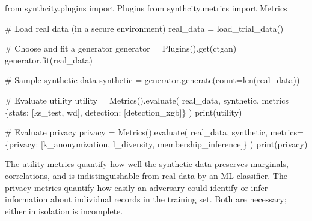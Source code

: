 \documentclass[
  letterpaper,
  11pt]{scrbook}
\newenvironment{Shaded}{\begin{snugshade}}{\end{snugshade}}
\newcommand{\BuiltInTok}[1]{\textcolor[rgb]{0.00,0.23,0.31}{#1}}
\newcommand{\CommentTok}[1]{\textcolor[rgb]{0.37,0.37,0.37}{#1}}
\newcommand{\ImportTok}[1]{\textcolor[rgb]{0.00,0.46,0.62}{#1}}
\newcommand{\NormalTok}[1]{\textcolor[rgb]{0.00,0.23,0.31}{#1}}
\newcommand{\OperatorTok}[1]{\textcolor[rgb]{0.37,0.37,0.37}{#1}}
\newcommand{\StringTok}[1]{\textcolor[rgb]{0.13,0.47,0.30}{#1}}
\begin{document}
\begin{Shaded}
\begin{Highlighting}[]
\ImportTok{from}\NormalTok{ synthcity.plugins }\ImportTok{import}\NormalTok{ Plugins}
\ImportTok{from}\NormalTok{ synthcity.metrics }\ImportTok{import}\NormalTok{ Metrics}

\CommentTok{\# Load real data (in a secure environment)}
\NormalTok{real\_data }\OperatorTok{=}\NormalTok{ load\_trial\_data()}

\CommentTok{\# Choose and fit a generator}
\NormalTok{generator }\OperatorTok{=}\NormalTok{ Plugins().get(}\StringTok{\textquotesingle{}ctgan\textquotesingle{}}\NormalTok{)}
\NormalTok{generator.fit(real\_data)}

\CommentTok{\# Sample synthetic data}
\NormalTok{synthetic }\OperatorTok{=}\NormalTok{ generator.generate(count}\OperatorTok{=}\BuiltInTok{len}\NormalTok{(real\_data))}

\CommentTok{\# Evaluate utility}
\NormalTok{utility }\OperatorTok{=}\NormalTok{ Metrics().evaluate(}
\NormalTok{    real\_data, synthetic,}
\NormalTok{    metrics}\OperatorTok{=}\NormalTok{\{}\StringTok{\textquotesingle{}stats\textquotesingle{}}\NormalTok{: [}\StringTok{\textquotesingle{}ks\_test\textquotesingle{}}\NormalTok{, }\StringTok{\textquotesingle{}wd\textquotesingle{}}\NormalTok{],}
             \StringTok{\textquotesingle{}detection\textquotesingle{}}\NormalTok{: [}\StringTok{\textquotesingle{}detection\_xgb\textquotesingle{}}\NormalTok{]\}}
\NormalTok{)}
\BuiltInTok{print}\NormalTok{(utility)}

\CommentTok{\# Evaluate privacy}
\NormalTok{privacy }\OperatorTok{=}\NormalTok{ Metrics().evaluate(}
\NormalTok{    real\_data, synthetic,}
\NormalTok{    metrics}\OperatorTok{=}\NormalTok{\{}\StringTok{\textquotesingle{}privacy\textquotesingle{}}\NormalTok{: [}\StringTok{\textquotesingle{}k\_anonymization\textquotesingle{}}\NormalTok{,}
                         \StringTok{\textquotesingle{}l\_diversity\textquotesingle{}}\NormalTok{,}
                         \StringTok{\textquotesingle{}membership\_inference\textquotesingle{}}\NormalTok{]\}}
\NormalTok{)}
\BuiltInTok{print}\NormalTok{(privacy)}
\end{Highlighting}
\end{Shaded}

The utility metrics quantify how well the synthetic data preserves
marginals, correlations, and is indistinguishable from real data by an
ML classifier. The privacy metrics quantify how easily an adversary
could identify or infer information about individual records in the
training set. Both are necessary; either in isolation is incomplete.
\end{document}

